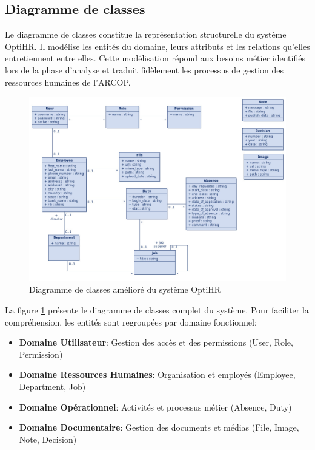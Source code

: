 \subsection{Diagramme de classes}
Le diagramme de classes constitue la représentation structurelle du système OptiHR. Il modélise les entités du domaine, leurs attributs et les relations qu'elles entretiennent entre elles. Cette modélisation répond aux besoins métier identifiés lors de la phase d'analyse et traduit fidèlement les processus de gestion des ressources humaines de l'ARCOP.

\begin{figure}[H]
    \centering
    \includegraphics[width=\textwidth]{images/diagrammes/class/diagramme.jpeg}
    \caption{Diagramme de classes amélioré du système OptiHR}
    \label{fig:class_diagram_improved}
\end{figure}

La figure \ref{fig:class_diagram_improved} présente le diagramme de classes complet du système. Pour faciliter la compréhension, les entités sont regroupées par domaine fonctionnel:

\begin{itemize}
    \item \textbf{Domaine Utilisateur}: Gestion des accès et des permissions (User, Role, Permission)
    \item \textbf{Domaine Ressources Humaines}: Organisation et employés (Employee, Department, Job)
    \item \textbf{Domaine Opérationnel}: Activités et processus métier (Absence, Duty)
    \item \textbf{Domaine Documentaire}: Gestion des documents et médias (File, Image, Note, Decision)
\end{itemize}

